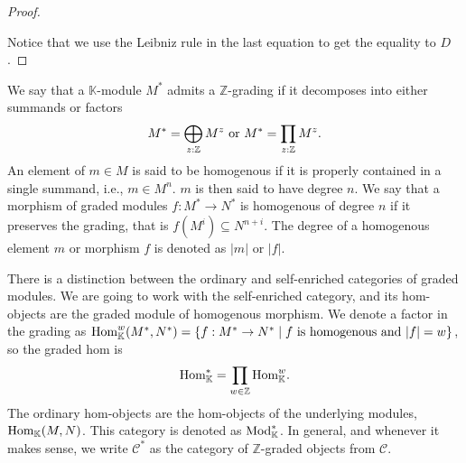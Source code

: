 \documentclass[../thesis.tex]{subfiles}
\begin{document}
\begin{proof}
\begin{center}
                \end{center}

                Notice that we use the Leibniz rule in the last equation to get the equality to $D$. 

            \end{proof}

            We say that a $\mathbb{K}$-module $M^*$ admits a $\mathbb{Z}$-grading if it decomposes into either summands or factors
            \begin{align*}
                M^* = \bigoplus_{z:\mathbb{Z}}M^z\tt{ or } M^* = \prod_{z:\mathbb{Z}}M^z\tt{.}
            \end{align*}
            An element of $m\in M$ is said to be homogenous if it is properly contained in a single summand, i.e., $m\in M^n$. $m$ is then said to have degree $n$. We say that a morphism of graded modules $f: M^*\rightarrow N^*$ is homogenous of degree $n$ if it preserves the grading, that is $f(M^i) \subseteq N^{n+i}$. The degree of a homogenous element $m$ or morphism $f$ is denoted as $|m|$ or $|f|$.
            
            There is a distinction between the ordinary and self-enriched categories of graded modules. We are going to work with the self-enriched category, and its hom-objects are the graded module of homogenous morphism. We denote a factor in the grading as $\tt{Hom}_\mathbb{K}^w(M^*,N^*)=\startset{f : M^* \rightarrow N^* \mid f\tt{ is homogenous and }|f|=w}$, so the graded hom is
            \begin{align*}
                \tt{Hom}_\mathbb{K}^* = \prod_{w\in\mathbb{Z}}\tt{Hom}_\mathbb{K}^w\tt{.}
            \end{align*}
            The ordinary hom-objects are the hom-objects of the underlying modules, $\tt{Hom}_\mathbb{K}(M, N)$. This category is denoted as $\tt{Mod}_\mathbb{K}^*$. In general, and whenever it makes sense, we write $\mathcal{C}^*$ as the category of $\mathbb{Z}$-graded objects from $\mathcal{C}$.
\end{document}
